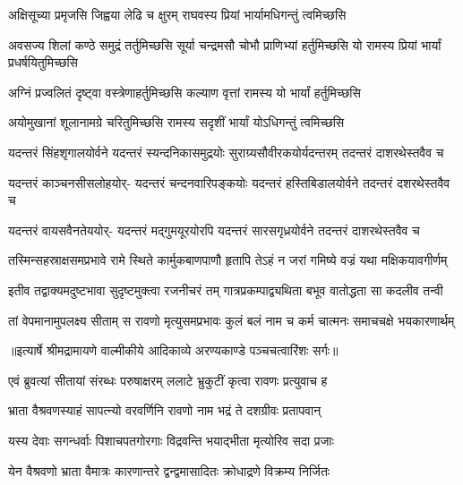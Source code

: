 \twolineshloka
{अक्षिसूच्या प्रमृजसि जिह्वया लेढि च क्षुरम्}
{राघवस्य प्रियां भार्यामधिगन्तुं त्वमिच्छसि} %

\threelineshloka
{अवसज्य शिलां कण्ठे समुद्रं तर्तुमिच्छसि}
{सूर्या चन्द्रमसौ चोभौ प्राणिभ्यां हर्तुमिच्छसि}
{यो रामस्य प्रियां भार्यां प्रधर्षयितुमिच्छसि} %

\twolineshloka
{अग्निं प्रज्वलितं दृष्ट्वा वस्त्रेणाहर्तुमिच्छसि}
{कल्याण वृत्तां रामस्य यो भार्यां हर्तुमिच्छसि} %

\twolineshloka
{अयोमुखानां शूलानामग्रे चरितुमिच्छसि}
{रामस्य सदृशीं भार्यां योऽधिगन्तुं त्वमिच्छसि} %

\fourlineindentedshloka
{यदन्तरं सिंहशृगालयोर्वने}
{यदन्तरं स्यन्दनिकासमुद्रयोः}
{सुराग्र्यसौवीरकयोर्यदन्तरम्}
{तदन्तरं दाशरथेस्तवैव च} %

\fourlineindentedshloka
{यदन्तरं काञ्चनसीसलोहयोर्-}
{यदन्तरं चन्दनवारिपङ्कयोः}
{यदन्तरं हस्तिबिडालयोर्वने}
{तदन्तरं दशरथेस्तवैव च} %

\fourlineindentedshloka
{यदन्तरं वायसवैनतेययोर्-}
{यदन्तरं मद्गुमयूरयोरपि}
{यदन्तरं सारसगृध्रयोर्वने}
{तदन्तरं दाशरथेस्तवैव च} %

\fourlineindentedshloka
{तस्मिन्सहस्राक्षसमप्रभावे}
{रामे स्थिते कार्मुकबाणपाणौ}
{हृतापि तेऽहं न जरां गमिष्ये}
{वज्रं यथा मक्षिकयावगीर्णम्} %

\fourlineindentedshloka
{इतीव तद्वाक्यमदुष्टभावा}
{सुदृष्टमुक्त्वा रजनीचरं तम्}
{गात्रप्रकम्पाद्व्यथिता बभूव}
{वातोद्धता सा कदलीव तन्वी} %

\fourlineindentedshloka
{तां वेपमानामुपलक्ष्य सीताम्}
{स रावणो मृत्युसमप्रभावः}
{कुलं बलं नाम च कर्म चात्मनः}
{समाचचक्षे भयकारणार्थम्} %


{॥इत्यार्षे श्रीमद्रामायणे वाल्मीकीये आदिकाव्ये अरण्यकाण्डे पञ्चचत्वारिंशः सर्गः॥}


\twolineshloka
{एवं ब्रुवत्यां सीतायां संरब्धः परुषाक्षरम्}
{ललाटे भ्रुकुटीं कृत्वा रावणः प्रत्युवाच ह} %

\twolineshloka
{भ्राता वैश्रवणस्याहं सापत्न्यो वरवर्णिनि}
{रावणो नाम भद्रं ते दशग्रीवः प्रतापवान्} %

\twolineshloka
{यस्य देवाः सगन्धर्वाः पिशाचपतगोरगाः}
{विद्रवन्ति भयाद्भीता मृत्योरिव सदा प्रजाः} %

\twolineshloka
{येन वैश्रवणो भ्राता वैमात्रः कारणान्तरे}
{द्वन्द्वमासादितः क्रोधाद्रणे विक्रम्य निर्जितः} %

